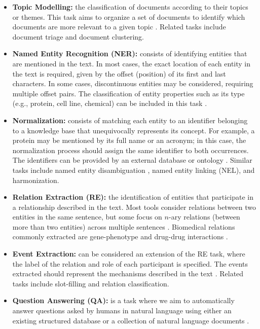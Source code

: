 \begin{itemize}
    \item \textbf{Topic Modelling:} the classification of documents according to their topics or themes. This task aims to organize a set of documents to identify which documents are more relevant to a given topic \citep{blei2012probabilistic}. Related tasks include document triage \citep{buchanan2007investigating} and document clustering.

    \item \textbf{Named Entity Recognition (NER):} consists of identifying entities that are mentioned in the text. In most cases, the exact location of each entity in the text is required, given by the offset (position) of its first and last characters. In some cases, discontinuous entities may be considered, requiring multiple offset pairs. The classification of entity properties such as its type (e.g., protein, cell line, chemical) can be included in this task \citep{nadeau2007survey}.

    \item \textbf{Normalization:} consists of matching each entity to an identifier belonging to a knowledge base that unequivocally represents its  concept. For example, a protein may be mentioned by its full name or an acronym; in this case, the normalization process should assign the same identifier to both occurrences. The identifiers can be provided by an external database or ontology \citep{tsuruoka2008normalizing}. Similar tasks include named entity disambiguation \citep{bunescu2006using}, named entity linking (NEL), and harmonization.

    \item \textbf{Relation Extraction (RE):} the identification of entities that participate in a relationship described in the text. Most tools consider relations between two entities in the same sentence, but some focus on $n$-ary relations (between more than two entities) across multiple sentences \citep{singhal2016text}. Biomedical relations commonly extracted are gene-phenotype and drug-drug interactions \citep{segura2014lessons}.

    \item \textbf{Event Extraction:} can be considered an extension of the RE task, where the label of the relation and role of each participant is specified. The events extracted should represent the mechanisms described in the text \citep{Ananiadou2010}. Related tasks include slot-filling and relation classification.

    \item \textbf{Question Answering (QA):} is a task where we aim to automatically answer questions asked by humans in natural language using either an existing structured database or a collection of natural language documents \citep{CALIJORNESOARES2020635}.
\end{itemize}

